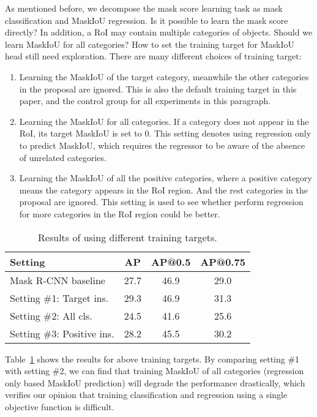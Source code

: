 \documentclass[10pt,twocolumn,letterpaper]{article}
\begin{document}
  
    
    As mentioned before, we decompose the mask score learning task as mask classification and MaskIoU regression. Is it possible to learn the mask score directly? 
In addition, a RoI may contain multiple categories of objects. Should we learn MaskIoU for all categories? How to set the training target for MaskIoU head still need exploration. There are many different choices of training target:
  
    
    \begin{enumerate}
    \setlength\itemsep{0.0em}
        \item Learning the MaskIoU of the target category, meanwhile the other categories in the proposal are ignored. This is also the default training target in this paper, and the control group for all experiments in this paragraph.
        \item Learning the MaskIoU for all categories. If a category does not appear in the RoI, its target MaskIoU is set to 0. This setting denotes using regression only to predict MaskIoU, which requires the regressor to be aware of the absence of unrelated categories. 
        \item Learning the MaskIoU of all the positive categories, where a positive category means the category appears in the RoI region. And the rest categories in the proposal are ignored. This setting is used to see whether perform regression for more categories in the RoI region could be better.
    \end{enumerate}
    
    


\begin{table}[ht!]
\caption{Results of using different training targets.}
\vspace{3mm}
  \centering
{\begin{tabular}{l|c c c}
  \toprule
    Setting & AP & AP@0.5 & AP@0.75 \\
    \midrule
    Mask R-CNN baseline & 27.7 & 46.9 & 29.0 \\
    Setting \#1: Target ins. & 29.3 & 46.9 & 31.3 \\
    Setting \#2: All cls.  & 24.5 & 41.6 & 25.6 \\
    Setting \#3: Positive ins.  & 28.2 & 45.5 & 30.2 \\
\bottomrule
  \end{tabular}}
  \label{table:trainallclasses}
\end{table}  



    Table~\ref{table:trainallclasses} shows the results for above training targets. By comparing setting \#1 with setting \#2, we can find that training MaskIoU of all categories (regression only based MaskIoU prediction) will degrade the performance drastically, which verifies our opinion that training classification and regression using a single objective function is difficult.
\end{document}
